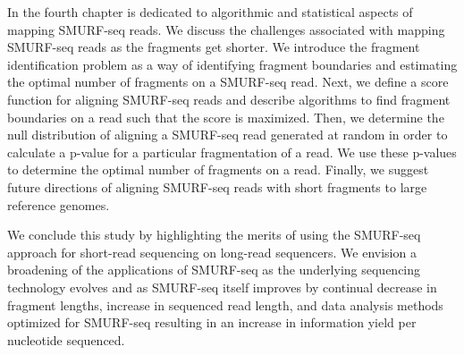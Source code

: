 In the fourth chapter is dedicated to algorithmic and statistical
aspects of mapping SMURF-seq reads. We
discuss the challenges associated with mapping SMURF-seq reads as the
fragments get shorter.
%
We introduce the fragment identification problem as a way of identifying
fragment boundaries and estimating the optimal number of fragments on a
SMURF-seq read.
%
Next, we define a score function for aligning SMURF-seq reads and describe
algorithms to find fragment boundaries on a read such that the score is
maximized.
%
Then, we determine the null distribution of aligning a SMURF-seq read
generated at random in order to calculate a p-value for a particular
fragmentation of a read. We use these p-values to determine the
optimal number of fragments on a read.
%
Finally, we suggest future directions of aligning SMURF-seq reads with
short fragments to large reference genomes.

We conclude this study by highlighting the merits of using the SMURF-seq
approach for short-read sequencing on long-read sequencers. We envision a
broadening of the applications of SMURF-seq as the underlying sequencing
technology evolves and as SMURF-seq itself improves by continual
decrease in fragment lengths, increase in sequenced read length, and
data analysis methods optimized for SMURF-seq resulting in an increase
in information yield per nucleotide sequenced.
